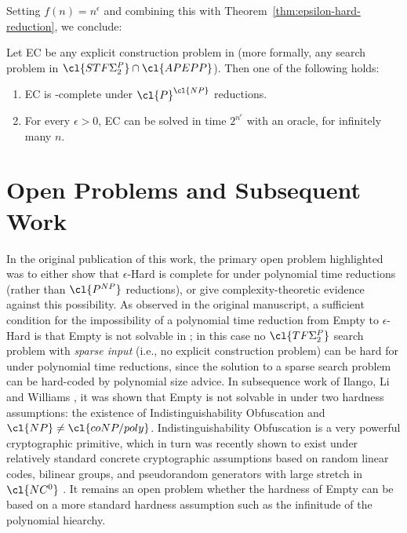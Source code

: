 Setting $f(n) = n^\epsilon$ and combining this with Theorem~\ref{thm:epsilon-hard-reduction}, we conclude:
\begin{theorem}\label{thm:dichotomy}
Let {\sc EC} be any explicit construction problem in  (more formally, any search problem in $\cl{STF\Sigma^P_2} \cap \cl{APEPP}$). Then one of the following holds:
\begin{enumerate}
    \item {\sc EC} is -complete under $\cl{P}^\cl{NP}$ reductions.
    \item For every $\epsilon > 0$, {\sc EC} can be solved in time $2^{n^{\epsilon}}$ with an  oracle, for infinitely many $n$.
\end{enumerate}
\end{theorem}

\section{Open Problems and Subsequent Work}\label{sec:open}
In the original publication of this work, the primary open problem highlighted was to either show that {\sc $\epsilon$-Hard} is complete for  under polynomial time reductions (rather than $\cl{P^{NP}}$ reductions), or give complexity-theoretic evidence against this possibility. As observed in the original manuscript, a sufficient condition for the impossibility of a polynomial time reduction from {\sc Empty} to {\sc $\epsilon$-Hard} is that {\sc Empty} is not solvable in ; in this case no $\cl{TF\Sigma_2^P}$ search problem with \emph{sparse input} (i.e., no explicit construction problem) can be hard for  under polynomial time reductions, since the solution to a sparse search problem can be hard-coded by polynomial size advice. In subsequence work of Ilango, Li and Williams \cite{ILW}, it was shown that {\sc Empty} is not solvable in  under two hardness assumptions: the existence of Indistinguishability Obfuscation and $\cl{NP} \neq \cl{coNP/poly}$. Indistinguishability Obfuscation is a very powerful cryptographic primitive, which in turn was recently shown to exist under relatively standard concrete cryptographic assumptions based on random linear codes, bilinear groups, and pseudorandom generators with large stretch in $\cl{NC^0}$ \cite{jls1,jls2}. It remains an open problem whether the hardness of {\sc Empty} can be based on a more standard hardness assumption such as the infinitude of the polynomial hiearchy.


